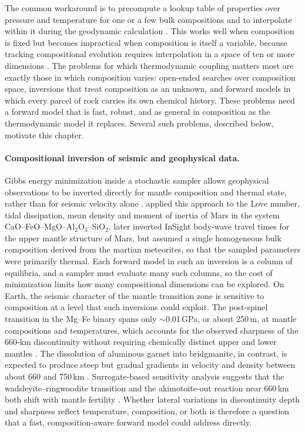 The common workaround is to precompute a lookup table of properties over pressure and temperature for one or a few bulk
compositions and to interpolate within it during the geodynamic calculation \citep{connolly2005,zunino2011,rummel2020,yuan2026}. This works
well when composition is fixed but becomes impractical when composition is itself a variable, because tracking compositional
evolution requires interpolation in a space of ten or more dimensions \citep{rummel2020,candioti2026}. The problems for which
thermodynamic coupling matters most are exactly those in which composition varies: open-ended searches over composition space,
inversions that treat composition as an unknown, and forward models in which every parcel of rock carries its own chemical history.
These problems need a forward model that is fast, robust, and as general in composition as the thermodynamic model it replaces.
Several such problems, described below, motivate this chapter.

\paragraph{Compositional inversion of seismic and geophysical data.} Gibbs energy minimization inside a stochastic sampler allows
geophysical observations to be inverted directly for mantle composition and thermal state, rather than for seismic velocity alone
\citep{khan2008}. \citet{khan2008} applied this approach to the Love number, tidal dissipation, mean density and moment of inertia
of Mars in the system CaO--FeO--MgO--Al$_2$O$_3$--SiO$_2$. \citet{khan2021} later inverted InSight body-wave travel times for the
upper mantle structure of Mars, but assumed a single homogeneous bulk composition derived from the martian meteorites, so that the
sampled parameters were primarily thermal. Each forward model in such an inversion is a column of equilibria, and a sampler must
evaluate many such columns, so the cost of minimization limits how many compositional dimensions can be explored. On Earth, the
seismic character of the mantle transition zone is sensitive to composition at a level that such inversions could exploit. The
post-spinel transition in the Mg--Fe binary spans only $\sim$0.01\,GPa, or about 250\,m, at mantle compositions and temperatures,
which accounts for the observed sharpness of the 660-km discontinuity without requiring chemically distinct upper and lower mantles
\citep{ishii2019}. The dissolution of aluminous garnet into bridgmanite, in contrast, is expected to produce steep but gradual
gradients in velocity and density between about 660 and 750\,km \citep{wood1996}. Surrogate-based sensitivity analysis suggests that
the wadsleyite--ringwoodite transition and the akimotoite-out reaction near 660\,km both shift with mantle fertility
\citep{hartmeier2026}. Whether lateral variations in discontinuity depth and sharpness reflect temperature, composition, or both is
therefore a question that a fast, composition-aware forward model could address directly.

